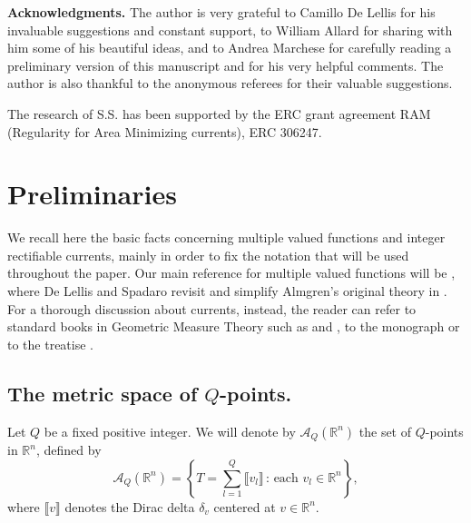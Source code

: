 \documentclass[a4paper,11pt,reqno]{amsart}
\theoremstyle{definition}
\numberwithin{equation}{section}
\numberwithin{subsection}{section}
\newcommand{\R}{\mathbb{R}}
\newcommand{\A}{\mathcal{A}}
\begin{document}
\medskip

\noindent\textbf{Acknowledgments.} The author is very grateful to Camillo De Lellis for his invaluable suggestions and constant support, to William Allard for sharing with him some of his beautiful ideas, and to Andrea Marchese for carefully reading a preliminary version of this manuscript and for his very helpful comments. The author is also thankful to the anonymous referees for their valuable suggestions.

The research of S.S. has been supported by the ERC grant agreement RAM (Regularity for Area Minimizing currents), ERC 306247.


\section{Preliminaries} \label{sec:prel}

We recall here the basic facts concerning multiple valued functions and integer rectifiable currents, mainly in order to fix the notation that will be used throughout the paper. Our main reference for multiple valued functions will be \cite{DLS11a}, where De Lellis and Spadaro revisit and simplify Almgren's original theory in \cite{Almgren00}. For a thorough discussion about currents, instead, the reader can refer to standard books in Geometric Measure Theory such as \cite{Sim83} and \cite{KP08}, to the monograph \cite{GMS98} or to the treatise \cite{Federer69}.

\subsection{The metric space of $Q$-points.} Let $Q$ be a fixed positive integer. We will denote by $\A_{Q}(\R^n)$ the set of $Q$-points in $\R^n$, defined by
\[
\A_{Q}(\R^n) = \left\lbrace T = \sum_{l=1}^{Q} \llbracket v_{l} \rrbracket \, \colon \, \mbox{each } v_{l} \in \R^n \right\rbrace,
\]
where $\llbracket v \rrbracket$ denotes the Dirac delta $\delta_{v}$ centered at $v \in \R^n$.

%
\end{document}

